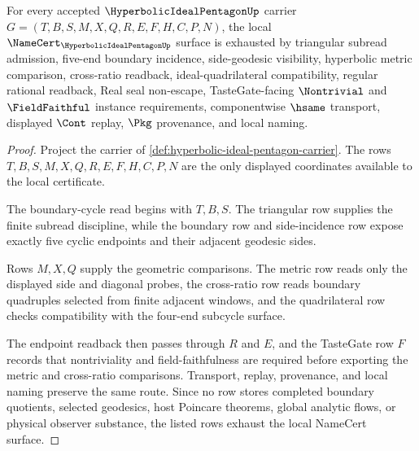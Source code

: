 \begin{theorem}
\label{thm:hyperbolic-ideal-pentagon-namecert-obligations}
For every accepted $\HyperbolicIdealPentagonUp$ carrier $G=(T,B,S,M,X,Q,R,E,F,H,C,P,N)$, the local $\NameCert_{\HyperbolicIdealPentagonUp}$ surface is exhausted by triangular subread admission, five-end boundary incidence, side-geodesic visibility, hyperbolic metric comparison, cross-ratio readback, ideal-quadrilateral compatibility, regular rational readback, Real seal non-escape, TasteGate-facing $\Nontrivial$ and $\FieldFaithful$ instance requirements, componentwise $\hsame$ transport, displayed $\Cont$ replay, $\Pkg$ provenance, and local naming.
\end{theorem}
\begin{proof}
Project the carrier of \autoref{def:hyperbolic-ideal-pentagon-carrier}. The rows $T,B,S,M,X,Q,R,E,F,H,C,P,N$ are the only displayed coordinates available to the local certificate.

The boundary-cycle read begins with $T,B,S$. The triangular row supplies the finite subread discipline, while the boundary row and side-incidence row expose exactly five cyclic endpoints and their adjacent geodesic sides.

Rows $M,X,Q$ supply the geometric comparisons. The metric row reads only the displayed side and diagonal probes, the cross-ratio row reads boundary quadruples selected from finite adjacent windows, and the quadrilateral row checks compatibility with the four-end subcycle surface.

The endpoint readback then passes through $R$ and $E$, and the TasteGate row $F$ records that nontriviality and field-faithfulness are required before exporting the metric and cross-ratio comparisons. Transport, replay, provenance, and local naming preserve the same route. Since no row stores completed boundary quotients, selected geodesics, host Poincare theorems, global analytic flows, or physical observer substance, the listed rows exhaust the local NameCert surface.
\end{proof}



